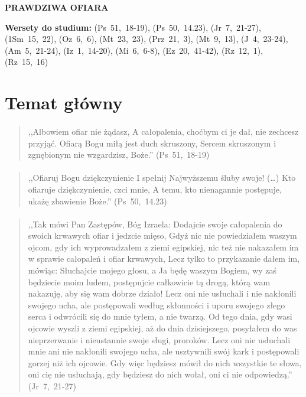 \documentclass[10pt,a4paper,oneside]{article}
\begin{document}
\centerline{\textbf{\MakeUppercase{Prawdziwa ofiara}}}
\begin{center}
\textbf{Wersety do studium:} \mbox{(Ps 51, 18-19)}, \mbox{(Ps 50, 14.23)}, \mbox{(Jr 7, 21-27)}, \mbox{(1Sm 15, 22)}, \mbox{(Oz 6, 6)}, \mbox{(Mt 23, 23)}, \mbox{(Prz 21, 3)}, \mbox{(Mt 9, 13)}, \mbox{(J 4, 23-24)}, \mbox{(Am 5, 21-24)}, \mbox{(Iz 1, 14-20)}, \mbox{(Mi 6, 6-8)}, \mbox{(Ez 20, 41-42)}, \mbox{(Rz 12, 1)}, \mbox{(Rz 15, 16)}
\end{center}
\section{Temat główny}
\paragraph{}
\begin{quote}
,,Albowiem ofiar nie żądasz, A całopalenia, choćbym ci je dał, nie zechcesz przyjąć. Ofiarą Bogu miłą jest duch skruszony, Sercem skruszonym i zgnębionym nie wzgardzisz, Boże.'' \mbox{(Ps 51, 18-19)}
\end{quote}
\paragraph{}
\begin{quote}
,,Ofiaruj Bogu dziękczynienie I spełnij Najwyższemu śluby swoje! (\ldots) Kto ofiaruje dziękczynienie, czci mnie, A temu, kto nienagannie postępuje, ukażę zbawienie Boże.'' \mbox{(Ps 50, 14.23)}
\end{quote}
\paragraph{}
\begin{quote}
,,Tak mówi Pan Zastępów, Bóg Izraela: Dodajcie swoje całopalenia do swoich krwawych ofiar i jedzcie mięso, Gdyż nic nie powiedziałem waszym ojcom, gdy ich wyprowadzałem z ziemi egipskiej, nic też nie nakazałem im w sprawie całopaleń i ofiar krwawych, Lecz tylko to przykazanie dałem im, mówiąc: Słuchajcie mojego głosu, a Ja będę waszym Bogiem, wy zaś będziecie moim ludem, postępujcie całkowicie tą drogą, którą wam nakazuję, aby się wam dobrze działo! Lecz oni nie usłuchali i nie nakłonili swojego ucha, ale postępowali według skłonności i uporu swojego złego serca i odwrócili się do mnie tyłem, a nie twarzą. Od tego dnia, gdy wasi ojcowie wyszli z ziemi egipskiej, aż do dnia dzisiejszego, posyłałem do was nieprzerwanie i nieustannie swoje sługi, proroków. Lecz oni nie usłuchali mnie ani nie nakłonili swojego ucha, ale usztywnili swój kark i postępowali gorzej niż ich ojcowie. Gdy więc będziesz mówił do nich wszystkie te słowa, oni cię nie usłuchają, gdy będziesz do nich wołał, oni ci nie odpowiedzą.'' \mbox{(Jr 7, 21-27)}
\end{quote}
\end{document}
